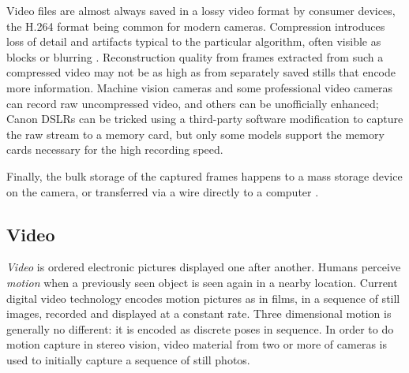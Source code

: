 
Video files are almost always saved in a lossy video format by consumer devices, the H.264 format being common for modern cameras.
Compression introduces loss of detail and artifacts typical to the particular algorithm, often visible as blocks or blurring \cite{richardson2004h264}.
Reconstruction quality from frames extracted from such a compressed video may not be as high as from separately saved stills that encode more information.
Machine vision cameras and some professional video cameras can record raw uncompressed video, and others can be unofficially enhanced;
Canon DSLRs can be tricked using a third-party software modification \cite{magiclantern} to capture the raw stream to a memory card, but only some models support the memory cards necessary for the high recording speed.

Finally, the bulk storage of the captured frames happens to a mass storage device on the camera, or transferred via a wire directly to a computer \cite{hornberg2007handbook,ni2013choosing}.


\subsection{Video} \label{sec:video} %



\emph{Video} is ordered electronic pictures displayed one after another.
Humans perceive \emph{motion} when a previously seen object is seen again in a nearby location.
Current digital video technology encodes motion pictures as in films, in a sequence of still images, recorded and displayed at a constant rate.
Three dimensional motion is generally no different: it is encoded as discrete poses in sequence.
In order to do motion capture in stereo vision, video material from two or more of cameras is used to initially capture a sequence of still photos.

